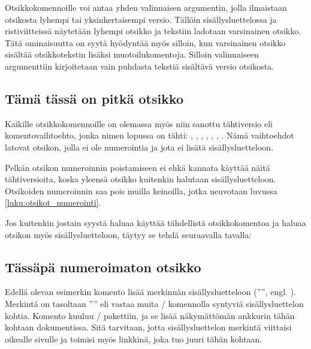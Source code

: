 Otsikkokomennoille voi antaa yhden valinnaisen argumentin, jolla
ilmaistaan otsikosta lyhempi tai yksinkertaisempi versio. Tällöin
sisällysluettelossa ja ristiviitteissä näytetään lyhempi otsikko ja
tekstiin ladotaan varsinainen otsikko. Tätä ominaisuutta on syytä
hyödyntää myös silloin, kun varsinainen otsikko sisältää otsikkotekstin
lisäksi muotoilukomentoja. Silloin valinnaiseen argumenttiin
kirjoitetaan vain puhdasta tekstiä sisältävä versio otsikosta.

\begin{koodilohkosis}
\section[Lyhyt otsikko]{Tämä tässä on pitkä otsikko}
\end{koodilohkosis}

Kaikille otsikkokomennoille on olemassa myös niin sanottu tähtiversio
eli komentovaihtoehto, jonka nimen lopussa on tähti: ,
, , ,
, , .
Nämä vaihtoehdot latovat otsikon, jolla ei ole numerointia ja jota ei
lisätä sisällysluetteloon.

Pelkän otsikon numeroinnin poistamiseen ei ehkä kannata käyttää näitä
tähtiversioita, koska yleensä otsikko kuitenkin halutaan
sisällysluetteloon. Otsikoiden numeroinnin saa pois muilla keinoilla,
jotka neuvotaan luvussa \ref{luku:otsikot_numerointi}.

Jos kuitenkin jostain syystä haluaa käyttää tähdellistä otsikkokomentoa
ja haluaa otsikon myös sisällysluetteloon, täytyy se tehdä seuraavalla
tavalla:

\begin{koodilohkosis}
\section*{Tässäpä numeroimaton otsikko}
{}
\end{koodilohkosis}

Edellä olevan esimerkin komento  lisää
merkinnän sisällysluetteloon ('''', engl.
). Merkintä on tasoltaan
'''' eli vastaa muita \-/ komennolla
syntyviä sisällysluettelon kohtia. Komento 
kuuluu \-/ pakettiin, ja se lisää näkymättömän
ankkurin tähän kohtaan dokumentissa. Sitä tarvitaan, jotta
sisällysluettelon merkintä viittaisi oikealle sivulle ja toimisi myös
linkkinä, joka tuo juuri tähän kohtaan.

